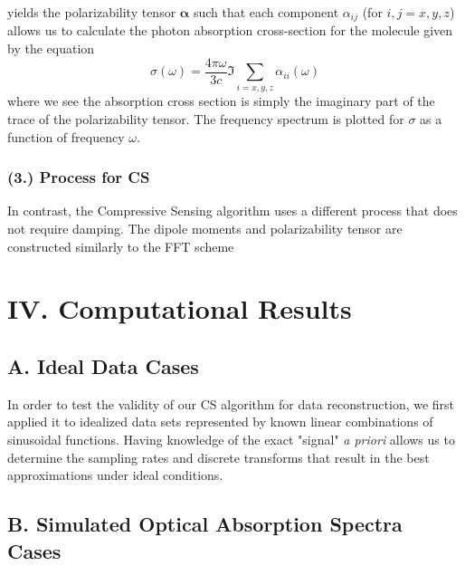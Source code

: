 \documentclass[11pt]{article}
\begin{document}
yields the polarizability tensor $\mathbf{\alpha}$ such that each component $\alpha_{ij}$ (for $i,j = x,y,z$) allows us to calculate the photon absorption cross-section for the molecule given by the equation
$$\sigma(\omega) = \frac{4 \pi \omega}{3c}  \Im\sum_{i = x, y, z} \alpha_{ii}(\omega)$$
where we see the absorption cross section is simply the imaginary part of the trace of the polarizability tensor.  The frequency spectrum is plotted for $\sigma$ as a function of frequency $\omega$.

\subsubsection*{(3.)	Process for CS}

In contrast, the Compressive Sensing algorithm uses a different process that does not require damping.  The dipole moments and polarizability tensor are constructed similarly to the FFT scheme



\section*{IV.	Computational Results} %


\subsection*{A.	Ideal Data Cases}
In order to test the validity of our CS algorithm for data reconstruction, we first applied it to idealized data sets represented by known linear combinations of sinusoidal functions. Having knowledge of the exact "signal" \emph{a priori} allows us to determine the sampling rates and discrete transforms that result in the best approximations under ideal conditions. 



\subsection*{B.	Simulated Optical Absorption Spectra Cases}
\end{document}
